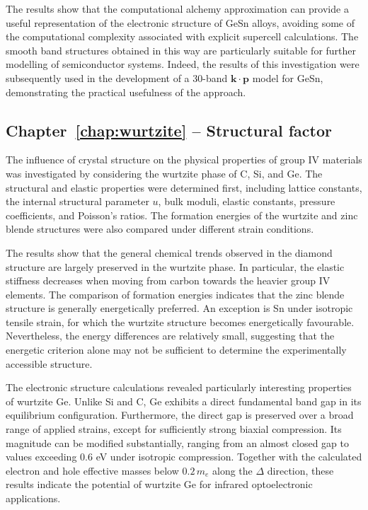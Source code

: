 The results show that the computational alchemy approximation can provide a useful representation of the electronic structure of GeSn alloys, avoiding some of the computational complexity associated with explicit supercell calculations. The smooth band structures obtained in this way are particularly suitable for further modelling of semiconductor systems. Indeed, the results of this investigation were subsequently used in the development of a 30-band $\mathbf{k}\cdot\mathbf{p}$ model for GeSn, demonstrating the practical usefulness of the approach.

\ornament

\subsection*{Chapter~\ref{chap:wurtzite} -- Structural factor}

The influence of crystal structure on the physical properties of group IV materials was investigated by considering the wurtzite phase of C, Si, and Ge. The structural and elastic properties were determined first, including lattice constants, the internal structural parameter $u$, bulk moduli, elastic constants, pressure coefficients, and Poisson's ratios. The formation energies of the wurtzite and zinc blende structures were also compared under different strain conditions.

The results show that the general chemical trends observed in the diamond structure are largely preserved in the wurtzite phase. In particular, the elastic stiffness decreases when moving from carbon towards the heavier group IV elements. The comparison of formation energies indicates that the zinc blende structure is generally energetically preferred. An exception is Sn under isotropic tensile strain, for which the wurtzite structure becomes energetically favourable. Nevertheless, the energy differences are relatively small, suggesting that the energetic criterion alone may not be sufficient to determine the experimentally accessible structure.

The electronic structure calculations revealed particularly interesting properties of wurtzite Ge. Unlike Si and C, Ge exhibits a direct fundamental band gap in its equilibrium configuration. Furthermore, the direct gap is preserved over a broad range of applied strains, except for sufficiently strong biaxial compression. Its magnitude can be modified substantially, ranging from an almost closed gap to values exceeding $0.6$ eV under isotropic compression. Together with the calculated electron and hole effective masses below $0.2\,m_e$ along the $\Delta$ direction, these results indicate the potential of wurtzite Ge for infrared optoelectronic applications.

